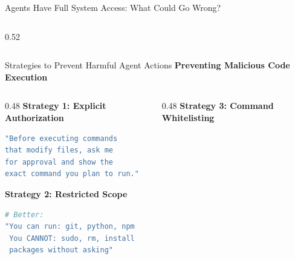 \documentclass[aspectratio=169,11pt]{beamer}
\begin{document}
\begin{frame}{Agents Have Full System Access: What Could Go Wrong?}
\begin{columns}[T]
\begin{column}{0.52\textwidth}
        \end{column}
    \end{columns}
\end{frame}

\begin{frame}[fragile]{Strategies to Prevent Harmful Agent Actions}
    \textbf{Preventing Malicious Code Execution}

    \begin{columns}[T]
        \begin{column}{0.48\textwidth}
            \textbf{Strategy 1: Explicit Authorization}
            \begin{lstlisting}[language=Bash]
"Before executing commands
that modify files, ask me
for approval and show the
exact command you plan to run."
            \end{lstlisting}

            \textbf{Strategy 2: Restricted Scope}
            \begin{lstlisting}[language=Bash]
# Better:
"You can run: git, python, npm
 You CANNOT: sudo, rm, install
 packages without asking"
            \end{lstlisting}
        \end{column}
        \begin{column}{0.48\textwidth}
            \textbf{Strategy 3: Command Whitelisting}


\end{column}
\end{columns}
\end{frame}
\end{document}
